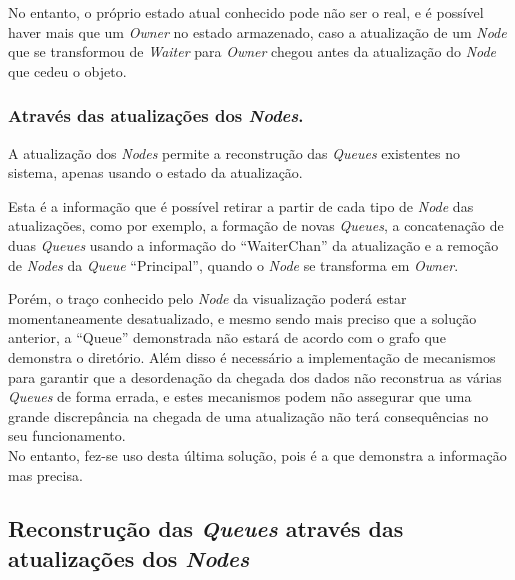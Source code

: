 No entanto, o próprio estado atual conhecido pode não ser o real, e é possível haver mais que um \emph{Owner}
no estado armazenado, caso a atualização de um \emph{Node} que se transformou de \emph{Waiter} para \emph{Owner} chegou antes da atualização do \emph{Node} que cedeu o objeto.


\subsubsection*{Através das atualizações dos \emph{Nodes}.}

A atualização dos \emph{Nodes} permite a reconstrução das \emph{Queues} existentes no sistema, apenas usando o estado da atualização.

Esta é a informação que é possível retirar a partir de cada tipo de \emph{Node} das atualizações, como por exemplo, a formação de novas \emph{Queues}, a concatenação de duas \emph{Queues} usando a informação do ``WaiterChan'' da atualização e a remoção de \emph{Nodes} da \emph{Queue} ``Principal'', quando o \emph{Node} se transforma em \emph{Owner}.

Porém, o traço conhecido pelo \emph{Node} da visualização poderá estar momentaneamente desatualizado, e mesmo sendo mais preciso que a solução anterior, a ``Queue'' demonstrada não estará de acordo com o grafo que demonstra o diretório. Além disso é necessário a implementação de mecanismos para garantir que a desordenação da chegada dos dados não reconstrua as várias \emph{Queues} de forma errada, e estes mecanismos podem não assegurar que uma grande discrepância na chegada de uma atualização não terá consequências no seu funcionamento.\\


No entanto, fez-se uso desta última solução, pois é a que demonstra a informação mas precisa.


\subsection*{Reconstrução das \emph{Queues} através das atualizações dos \emph{Nodes}}

